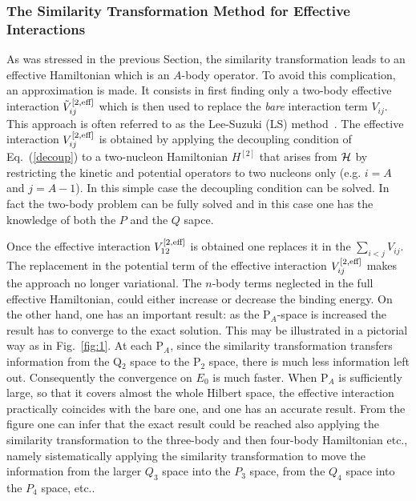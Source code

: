 
\subsubsection{The Similarity Transformation Method for Effective Interactions}
\label{sec:LS}

As was stressed in the previous Section, the similarity transformation leads to  an  effective Hamiltonian 
which is an $A$-body operator. To avoid this complication, an approximation is made. It consists 
in first finding only a two-body effective interaction $\tilde V_{ij}^{\rm [2,eff]}$
which is then used to replace  the {\it bare} interaction term $ V_{ij}$. This approach is often referred to
as the Lee-Suzuki (LS) method~\cite{SuL80}. The effective interaction $V_{ij}^{\rm [2,eff]}$
is obtained  by applying the decoupling condition of Eq.~(\ref{decoup}) to a two-nucleon
Hamiltonian $H^{[2]}$  that arises from ${\cal H}$ by restricting  the kinetic and potential operators
to two nucleons only (e.g. $i=A$ and $j=A-1$). In this simple case the decoupling condition can be solved.
In fact the two-body problem can be fully solved and in this case one has the knowledge of both the $P$ and the $Q$ sapce.

Once the effective interaction $ V_{12}^{\rm [2,eff]}$ is obtained one replaces it in the $\sum_{i<j} V_{ij}$.
The replacement in the potential term of the effective interaction $ V_{ij}^{\rm [2,eff]}$ 
makes the approach no longer  variational. 
The $n$-body terms neglected in the full effective Hamiltonian, could either increase
or decrease the binding energy. On the other hand, one has an important result: as the P${\!_A}$-space  is increased
the result has to converge to the exact solution.
This may be illustrated in a pictorial way as in Fig.~\ref{fig:1}. At each P$_{\!A}$,  since
the similarity transformation transfers information from the Q$_{2}$ space
to the P$_2$ space, there is much less information left out. Consequently the convergence on $E_0$ is much faster. 
When  P$_{\!\!A}$ is  sufficiently large, so that it covers almost the 
whole Hilbert space, the effective interaction practically coincides  with the bare one, and one has an accurate result. 
From the figure one can infer that the exact result could be reached also applying the similarity transformation to the 
three-body and then four-body  Hamiltonian etc., namely sistematically applying the similarity transformation to
move the information from the larger $Q_3$ space into the
$P_3$ space, from the $Q_4$ space into the $P_4$ space, etc..

